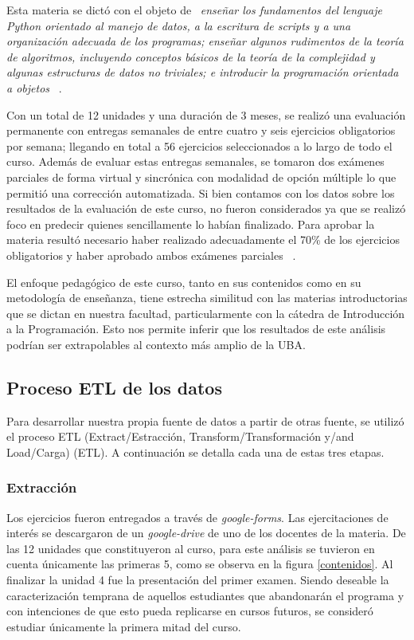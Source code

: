 \documentclass[11pt,a4paper,twoside,openany]{tesis}
\begin{document}
Esta materia se dictó con el objeto de ~\emph{enseñar los fundamentos del lenguaje Python orientado al manejo de datos, a la escritura de \emph{scripts} y a una organización adecuada de los programas; enseñar  algunos  rudimentos  de  la  teoría  de  algoritmos,  incluyendo  conceptos  básicos  de  la teoría de la complejidad y algunas estructuras de datos no triviales; e introducir la programación orientada a objetos} ~\cite{unsam2020}.

Con un total de 12 unidades y una duración de 3 meses, se realizó una evaluación permanente con entregas semanales de entre cuatro y seis ejercicios obligatorios por semana; llegando en total a  56  ejercicios  seleccionados  a  lo  largo  de  todo  el  curso.  Además  de  evaluar  estas  entregas semanales, se tomaron dos exámenes parciales de forma virtual y sincrónica con modalidad de opción múltiple lo que permitió una corrección automatizada. Si bien contamos con los datos sobre los resultados de la evaluación de este curso, no fueron considerados ya que se realizó foco en predecir quienes sencillamente lo habían finalizado. Para aprobar la materia resultó necesario haber realizado adecuadamente el 70\% de los  ejercicios  obligatorios  y  haber  aprobado  ambos  exámenes  parciales ~\cite{unsam2020}.

El enfoque pedagógico de este curso, tanto en sus contenidos como en su metodología de enseñanza, tiene estrecha similitud con las materias introductorias que se dictan en nuestra facultad, particularmente con la cátedra de Introducción a la Programación. Esto nos permite inferir que los resultados de este análisis podrían ser extrapolables al contexto más amplio de la UBA.


\subsection{Proceso ETL de los datos}

Para desarrollar nuestra propia fuente de datos a partir de otras fuente, se utilizó el proceso ETL (Extract/Estracción, Transform/Transformación y/and Load/Carga) (ETL). A continuación se detalla cada una de estas tres etapas.

\subsubsection{Extracción}\textbf{ }

Los ejercicios fueron entregados a través de \emph{google-forms}. Las ejercitaciones de interés se descargaron de un \emph{google-drive} de uno de los docentes de la materia. De las 12 unidades que constituyeron al curso, para este análisis se tuvieron en cuenta únicamente las primeras 5, como se observa en la figura \ref{contenidos}. Al finalizar la unidad 4 fue la presentación del primer examen. Siendo deseable la caracterización temprana de aquellos estudiantes que abandonarán el programa y con intenciones de que esto pueda replicarse en cursos futuros, se consideró estudiar únicamente la primera mitad del curso. 
\end{document}
